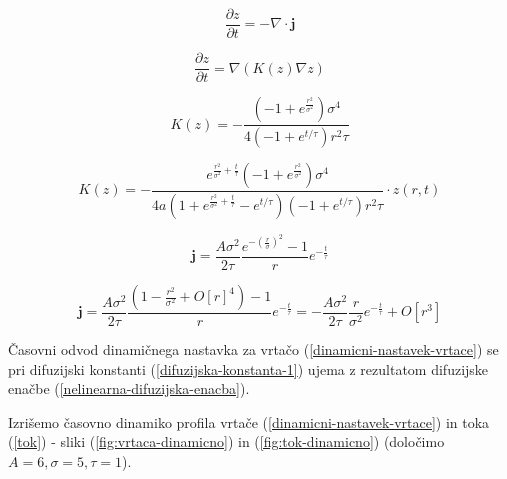 \documentclass[a4paper, oneside, 12pt]{book}
\begin{document}
  \begin{equation}
    \frac{\partial z}{\partial t} = - \nabla \cdot \mathbf{j}
    \label{kontinuitetna-enacba}
  \end{equation}

  \begin{equation}
    \frac{\partial z}{\partial t} = \nabla (K(z) \nabla z)
    \label{nelinearna-difuzijska-enacba}
  \end{equation}

  \begin{equation}
    K(z) = -\frac{\left(-1+e^{\frac{r^2}{\sigma ^2}}\right) \sigma ^4}{4 \left(-1+e^{t/\tau }\right) r^2 \tau }
    \label{difuzijska-konstanta-1}
  \end{equation}

  \[
    K(z) = -\frac{e^{\frac{r^2}{\sigma ^2}+\frac{t}{\tau }} \left(-1+e^{\frac{r^2}{\sigma ^2}}\right) \sigma ^4}{4 a \left(1+e^{\frac{r^2}{\sigma ^2}+\frac{t}{\tau }}-e^{t/\tau }\right) \left(-1+e^{t/\tau }\right) r^2 \tau } \cdot z(r,t)
    \]

    \begin{equation}
      \mathbf{j} = \frac{A \sigma^2}{2 \tau} \frac{e^{-(\frac{r}{\sigma})^2}-1}{r} e^{-\frac{t}{\tau}}
      \label{tok}
    \end{equation}

    \[
      \mathbf{j} = \frac{A \sigma^2}{2 \tau} \frac{\left( 1-\frac{r^2}{\sigma ^2}+O[r]^4 \right)-1}{r} e^{-\frac{t}{\tau}} = -\frac{A \sigma^2}{2 \tau} \frac{r}{\sigma ^2} e^{-\frac{t}{\tau}} + O[r^3]
      \]


      Časovni odvod dinamičnega nastavka za vrtačo (\ref{dinamicni-nastavek-vrtace}) se pri difuzijski konstanti (\ref{difuzijska-konstanta-1}) ujema z rezultatom difuzijske enačbe (\ref{nelinearna-difuzijska-enacba}).

      Izrišemo časovno dinamiko profila vrtače (\ref{dinamicni-nastavek-vrtace}) in toka (\ref{tok}) - sliki (\ref{fig:vrtaca-dinamicno}) in (\ref{fig:tok-dinamicno}) (določimo $A=6,\sigma=5,\tau = 1$).
\end{document}
